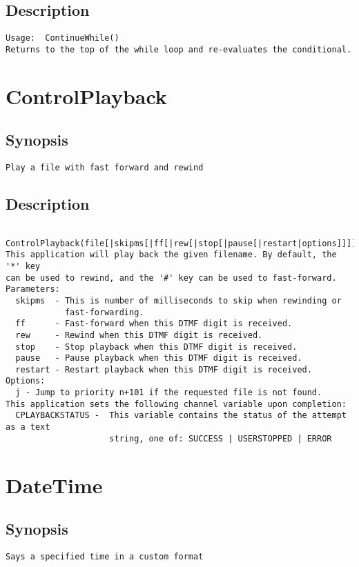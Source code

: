 \subsection{Description}
\begin{verbatim}
Usage:  ContinueWhile()
Returns to the top of the while loop and re-evaluates the conditional.

\end{verbatim}


\section{ControlPlayback}
\subsection{Synopsis}
\begin{verbatim}
Play a file with fast forward and rewind
\end{verbatim}
\subsection{Description}
\begin{verbatim}
  ControlPlayback(file[|skipms[|ff[|rew[|stop[|pause[|restart|options]]]]]]]):
This application will play back the given filename. By default, the '*' key
can be used to rewind, and the '#' key can be used to fast-forward.
Parameters:
  skipms  - This is number of milliseconds to skip when rewinding or
            fast-forwarding.
  ff      - Fast-forward when this DTMF digit is received.
  rew     - Rewind when this DTMF digit is received.
  stop    - Stop playback when this DTMF digit is received.
  pause   - Pause playback when this DTMF digit is received.
  restart - Restart playback when this DTMF digit is received.
Options:
  j - Jump to priority n+101 if the requested file is not found.
This application sets the following channel variable upon completion:
  CPLAYBACKSTATUS -  This variable contains the status of the attempt as a text
                     string, one of: SUCCESS | USERSTOPPED | ERROR

\end{verbatim}


\section{DateTime}
\subsection{Synopsis}
\begin{verbatim}
Says a specified time in a custom format
\end{verbatim}
